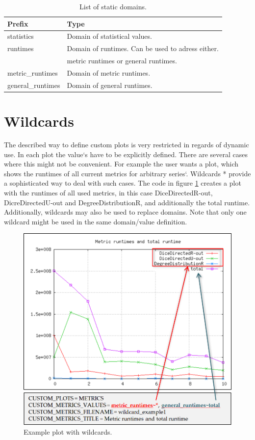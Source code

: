 \begin{table} [h]
\centering
\begin{tabular}[h]{|l|l|}\hline
	\textbf{Prefix} & \textbf{Type}\\
	\hline
	statistics & Domain of statistical values.\\
	\hline
	runtimes & Domain of runtimes. Can be used to adress either.\\
	& metric runtimes or general runtimes.\\
	\hline
	metric{\_}runtimes & Domain of metric runtimes.\\
	\hline
	general{\_}runtimes & Domain of general runtimes.\\
	\hline
\end{tabular}
\caption{List of static domains.}
\label{tab:domains}
\end{table}

\section{Wildcards}
The described way to define custom plots is very restricted in regards of dynamic use. In each plot the value‘s have to be explicitly defined. There are several cases where this might not be convenient. For example the user wants a plot, which shows the runtimes of all current metrics for arbitrary series‘. Wildcards * provide a sophisticated way to deal with such cases. The code in figure \ref{fig:36} creates a plot with the runtimes of all used metrics, in this case DiceDirectedR-out, DicreDirectedU-out and DegreeDistributionR, and additionally the total runtime. Additionally, wildcards may also be used to replace domains. Note that only one wildcard might be used in the same domain/value definition.

\begin{figure} [h]
\centering
\includegraphics [scale=0.5] {images/36}
\caption{Example plot with wildcards.}
\label{fig:36}
\end{figure}

